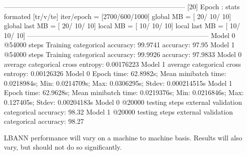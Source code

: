 \begin{DoxyCode}
--------------------------------------------------------------------------------
[20] Epoch : stats formated [tr/v/te] iter/epoch = [2700/600/1000]
global MB = [  20/  10/  10] global last MB = [  20/  10/  10]
local MB = [  10/  10/  10]  local last MB = [  10/  10/  10]
--------------------------------------------------------------------------------
Model 0 @54000 steps Training categorical accuracy: 99.9741%
       accuracy: 97.95%
Model 1 @54000 steps Training categorical accuracy: 99.9926%
       accuracy: 97.9833%
Model 0 average categorical cross entropy: 0.00176223
Model 1 average categorical cross entropy: 0.00126326
Model 0 Epoch time: 62.8982s; Mean minibatch time: 0.0218984s; Min: 0.0214709s; Max: 0.0306295s; Stdev:
       0.000214515s
Model 1 Epoch time: 62.9628s; Mean minibatch time: 0.0219376s; Min: 0.0216846s; Max: 0.127405s; Stdev:
       0.00204183s
Model 0 @20000 testing steps external validation categorical accuracy: 98.32%
Model 1 @20000 testing steps external validation categorical accuracy: 98.27%
\end{DoxyCode}
 L\+B\+A\+NN performance will vary on a machine to machine basis. Results will also vary, but should not do so significantly. 
